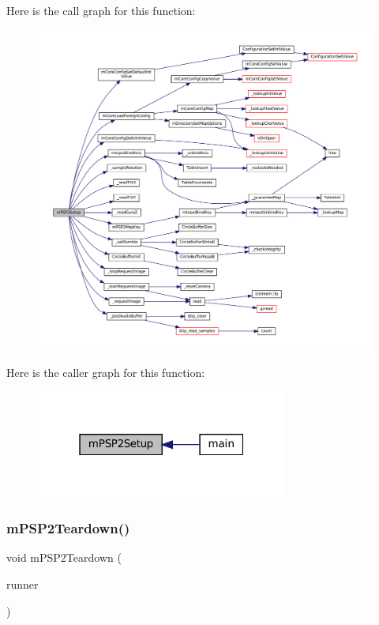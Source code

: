 Here is the call graph for this function\+:
\nopagebreak
\begin{figure}[H]
\begin{center}
\leavevmode
\includegraphics[width=350pt]{psp2-context_8c_a421c14012a9792c249822f943155921a_cgraph}
\end{center}
\end{figure}
Here is the caller graph for this function\+:
\nopagebreak
\begin{figure}[H]
\begin{center}
\leavevmode
\includegraphics[width=235pt]{psp2-context_8c_a421c14012a9792c249822f943155921a_icgraph}
\end{center}
\end{figure}
\mbox{\label{psp2-context_8c_aaae5f4b3a42c091f809836cec74d1cd7}} 
\subsubsection{\texorpdfstring{m\+P\+S\+P2\+Teardown()}{mPSP2Teardown()}}
{\footnotesize\ttfamily void m\+P\+S\+P2\+Teardown (\begin{DoxyParamCaption}\item[{struct \mbox{\hyperlink{structm_g_u_i_runner}{m\+G\+U\+I\+Runner}} $\ast$}]{runner }\end{DoxyParamCaption})}


